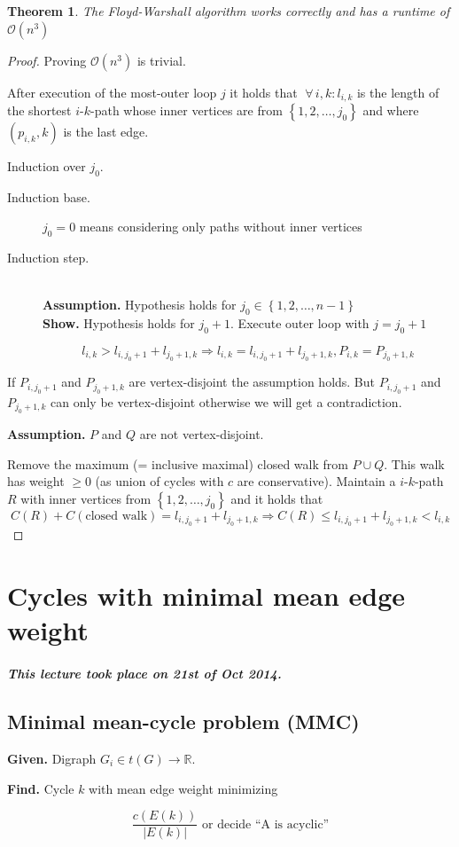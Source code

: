 \documentclass{article}
\newtheorem{theorem}{Theorem}
\newcommand{\set}[1]{\left\{#1\right\}}
\newcommand{\given}[1]{\textbf{Given.} #1\par}
\newcommand{\find}[1]{\textbf{Find.} #1\par}
\newcommand{\dateref}[1]{\paragraph{\textit{This lecture took place on #1.}}}
\newcommand{\gath}[2]{$#1$-$#2$-path} %
\newcommand{\fall}{\;\forall\,}
\begin{document}
\begin{theorem}\label{satz-3.6}
  The Floyd-Warshall algorithm works correctly and has a runtime of $\mathcal{O}(n^3)$
\end{theorem}

\begin{proof}
Proving $\mathcal{O}(n^3)$ is trivial.

After execution of the most-outer loop $j$ it holds that $\fall i,k: l_{i,k}$ is the length of the shortest \gath ik whose inner vertices are from $\set{1, 2, \ldots, j_0}$ and where $(p_{i,k}, k)$ is the last edge.

Induction over $j_0$.

\begin{description}
  \item[Induction base.] $j_0 = 0$ means considering only paths without inner vertices
  \item[Induction step.] \hfill{} \\
    \textbf{Assumption.} Hypothesis holds for $j_0 \in \set{1, 2, \ldots, n-1}$ \\
    \textbf{Show.} Hypothesis holds for $j_0 + 1$.
    Execute outer loop with $j = j_0 + 1$

    \[
      l_{i,k} > l_{i,j_0+1} + l_{j_0+1,k} \Rightarrow
        l_{i,k} = l_{i,j_0+1} + l_{j_0+1,k}, P_{i,k} = P_{j_0+1,k}
    \]
\end{description}

If $P_{i,j_0+1}$ and $P_{j_0+1,k}$ are vertex-disjoint the assumption holds. But $P_{i,j_0+1}$ and $P_{j_0+1,k}$ can only be vertex-disjoint otherwise we will get a contradiction.

\textbf{Assumption.}
 $P$ and $Q$ are not vertex-disjoint.

Remove the maximum (= inclusive maximal) closed walk from $P \cup Q$. This walk has weight $\geq 0$ (as union of cycles with $c$ are conservative). Maintain a \gath ik $R$ with inner vertices from $\set{1, 2, \ldots, j_0}$ and it holds that
\[
  C(R) + C(\text{closed walk}) = l_{i,j_0+1} + l_{j_0+1,k}
    \Rightarrow C(R) \leq l_{i,j_0+1} + l_{j_0+1,k} < l_{i,k}
\]
\end{proof}

\section{Cycles with minimal mean edge weight}
%
\dateref{21st of Oct 2014}
%
\subsection{Minimal mean-cycle problem (MMC)}
%
\given{Digraph $G_i \in t(G) \rightarrow \mathbb{R}$.}
\find{Cycle $k$ with mean edge weight minimizing}
\[
  \frac{c(E(k))}{|E(k)|} \text{ or decide ``A is acyclic''}
\]
\end{document}
